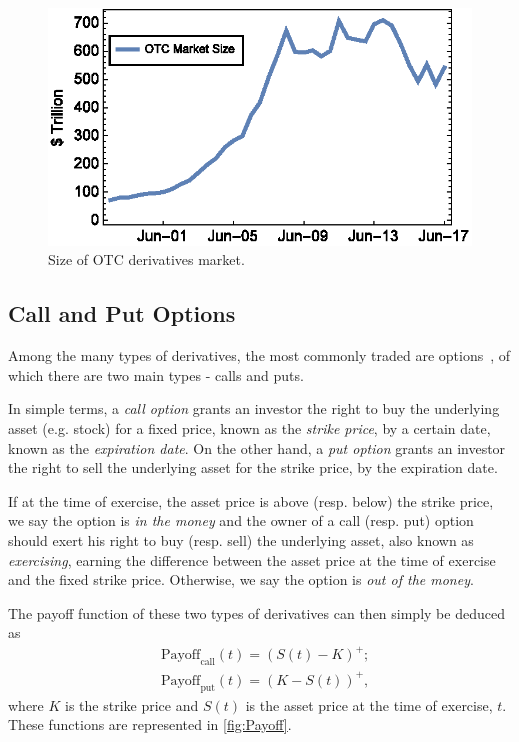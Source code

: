 \documentclass[a4paper,twocolumn,aps,prd,longbibliography,superscriptaddress]{revtex4-1}
\begin{document}
\begin{figure}[H]
    \centering
      \includegraphics[width=.9\columnwidth,trim={2pt 17pt 0 0},clip]{OTC.eps}
      \caption{Size of OTC derivatives market.}\label{fig:OTC}
    \end{figure}

\subsection{Call and Put Options}
Among the many types of derivatives, the most commonly traded are options~\citep{Hull}, of which there are two main types - calls and puts.

In simple terms, a \textit{call option} grants an investor the right to buy the underlying asset (e.g. stock) for a fixed price, known as the \textit{strike price}, by a certain date, known as the \textit{expiration date}.
On the other hand, a \textit{put option} grants an investor the right to sell the underlying asset for the strike price, by the expiration date.

If at the time of exercise, the asset price is above (resp. below) the strike price, we say the option is \textit{in the money} and the owner of a call (resp. put) option should exert his right to buy (resp. sell) the underlying asset, also known as \textit{exercising}, earning the difference between the asset price at the time of exercise and the fixed strike price. Otherwise, we say the option is \textit{out of the money}.

The payoff function of these two types of derivatives can then simply be deduced as
\begin{equation}\label{callput}
\begin{split}
&\text{Payoff}_\text{call}(t)=(S(t)-K)^+;\\
&\text{Payoff}_\text{put}(t)=(K-S(t))^+,
\end{split}
\end{equation}
\noindent where $K$ is the strike price and $S(t)$ is the asset price at the time of exercise, $t$. These functions are represented in \autoref{fig:Payoff}.
\end{document}
